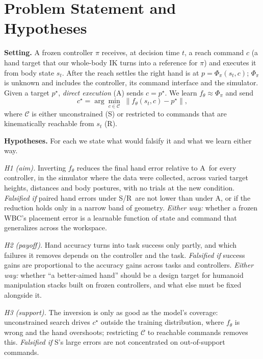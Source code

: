 \documentclass[conference]{IEEEtran}
\newcommand{\Ad}{\textsc{A}}   %
\newcommand{\Sinv}{\textsc{S}} %
\newcommand{\Rr}{\textsc{R}}   %
\begin{document}
\section{Problem Statement and Hypotheses}\label{sec:hyp}

\textbf{Setting.} A frozen controller $\pi$ receives, at decision time $t$, a reach command $c$ (a hand target that our whole-body IK turns into a reference for $\pi$) and executes it from body state $s_t$. After the reach settles the right hand is at $p=\Phi_\pi(s_t,c)$; $\Phi_\pi$ is unknown and includes the controller, its command interface and the simulator. Given a target $p^\star$, \emph{direct execution} (\Ad) sends $c=p^\star$. We learn $f_\theta\approx\Phi_\pi$ and send
\begin{equation}
c^\star=\arg\min_{c\in\mathcal{C}}\;\lVert f_\theta(s_t,c)-p^\star\rVert ,
\label{eq:inv}
\end{equation}
where $\mathcal{C}$ is either unconstrained (\Sinv) or restricted to commands that are kinematically reachable from $s_t$ (\Rr).

\textbf{Hypotheses.} For each we state what would falsify it and what we learn either way.

\emph{H1 (aim).} Inverting $f_\theta$ reduces the final hand error relative to \Ad\ for every controller, in the simulator where the data were collected, across varied target heights, distances and body postures, with no trials at the new condition. \emph{Falsified if} paired hand errors under \Sinv/\Rr\ are not lower than under \Ad, or if the reduction holds only in a narrow band of geometry. \emph{Either way:} whether a frozen WBC's placement error is a learnable function of state and command that generalizes across the workspace.

\emph{H2 (payoff).} Hand accuracy turns into task success only partly, and which failures it removes depends on the controller and the task. \emph{Falsified if} success gains are proportional to the accuracy gains across tasks and controllers. \emph{Either way:} whether ``a better-aimed hand'' should be a design target for humanoid manipulation stacks built on frozen controllers, and what else must be fixed alongside it.

\emph{H3 (support).} The inversion is only as good as the model's coverage: unconstrained search drives $c^\star$ outside the training distribution, where $f_\theta$ is wrong and the hand overshoots; restricting $\mathcal{C}$ to reachable commands removes this. \emph{Falsified if} \Sinv's large errors are not concentrated on out-of-support commands.
\end{document}
